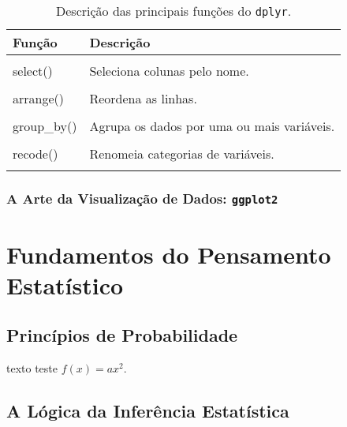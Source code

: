 \documentclass[
  12pt,
  letterpaper,
  DIV=11,
  numbers=noendperiod]{scrreprt}
\begin{document}
\begin{longtable}[t]{ll}

\caption{\label{tbl-dplyr-fcts}Descrição das principais funções do
\texttt{dplyr}.}

\tabularnewline

\toprule
Função & Descrição\\
\midrule
\cellcolor{gray!10}{glimpse()} & \cellcolor{gray!10}{Inspecionar conjuntos de dados.}\\
select() & Seleciona colunas pelo nome.\\
\cellcolor{gray!10}{filter()} & \cellcolor{gray!10}{Filtra linhas com base em seus valores.}\\
arrange() & Reordena as linhas.\\
\cellcolor{gray!10}{mutate()} & \cellcolor{gray!10}{Cria novas colunas (variáveis).}\\
\addlinespace
group\_by() & Agrupa os dados por uma ou mais variáveis.\\
\cellcolor{gray!10}{summarise()} & \cellcolor{gray!10}{Reduz múltiplos valores a um único resumo.}\\
recode() & Renomeia categorias de variáveis.\\
\cellcolor{gray!10}{n()} & \cellcolor{gray!10}{Conta o número de observações.}\\
\bottomrule

\end{longtable}

\section{\texorpdfstring{A Arte da Visualização de Dados:
\texttt{ggplot2}}{A Arte da Visualização de Dados: ggplot2}}\label{a-arte-da-visualizauxe7uxe3o-de-dados-ggplot2}

\part{Fundamentos do Pensamento Estatístico}

\chapter{Princípios de
Probabilidade}\label{princuxedpios-de-probabilidade}

texto teste \(f(x) = ax^2\).

\chapter{A Lógica da Inferência
Estatística}\label{a-luxf3gica-da-inferuxeancia-estatuxedstica}
\end{document}

